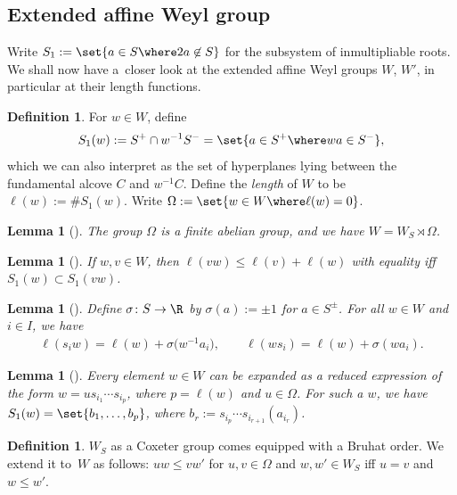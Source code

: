 \documentclass[pdftex]{sigma}
\newtheorem{Lemma}[Theorem]{Lemma}
\theoremstyle{definition}
\newtheorem{Definition}[Theorem]{Definition}
\numberwithin{equation}{section}
\begin{document}
\subsection{Extended affine Weyl group}
Write
$
 S_1:=\set{a\in S\where 2a\not\in S}
$
for the subsystem of inmultipliable roots. We shall now have a~closer look
at the extended affine Weyl groups $W$, $W'$, in particular at their length functions.

\begin{Definition}
 For $w\in W$, define
 \[
 S_1(w):=S^+\cap w^{-1} S^-
 = \set{a\in S^+\where wa\in S^-},
 \]
 which we can also interpret as the set of hyperplanes lying between the fundamental
 alcove $C$ and $w^{-1}C$. Define the \emph{length} of $W$ to be
$
 \ell(w) := \# S_1(w)$.
 Write $\Omega:=\set{w\in W\where \ell(w)=0}$.
\end{Definition}

\begin{Lemma}[{\cite[below equation~(2.2.3)]{macdonald}}]
 The group $\Omega$ is a finite abelian group, and we have
 $W=W_S\rtimes\Omega$.
\end{Lemma}

\begin{Lemma}[{\cite[Section~2.2.4]{macdonald}}]\label{sec:lem-lengths-add}
 If $w,v\in W$, then $\ell(vw)\le \ell(v)+\ell(w)$ with equality iff~${S_1(w)\subset S_1(vw)}$.
\end{Lemma}

\begin{Lemma}[{\cite[Section~2.2.8]{macdonald}}]\label{sec:lem-length-change}
 Define $\sigma\colon S\to\R$ by $\sigma(a):=\pm1$ for $a\in S^\pm$. For all
 $w\in W$ and $i\in I$, we have
 \begin{gather*}
 \ell(s_iw) = \ell(w) + \sigma\bigl(w^{-1}a_i\bigr),\qquad
 \ell(ws_i) = \ell(w) + \sigma(wa_i).
 \end{gather*}
\end{Lemma}

\begin{Lemma}[{\cite[Section~2.2.9]{macdonald}}]\label{sec:lem-flipped-roots}
 Every element $w\in W$ can be expanded as a reduced expression of the form
 $w=us_{i_1}\cdots s_{i_p}$, where $p=\ell(w)$ and $u\in\Omega$. For such a $w$, we have
$ S_1(w) = \set{b_1,\dots,b_p}$,
 where $b_r := s_{i_p}\cdots s_{i_{r+1}} (a_{i_r})$.
\end{Lemma}

\begin{Definition}
 $W_S$ as a Coxeter group comes equipped with a Bruhat order. We extend it to~$W$ as follows: $uw\le vw'$ for $u,v\in\Omega$ and $w,w'\in W_S$ iff
 $u=v$ and $w\le w'$.
\end{Definition}
\end{document}
